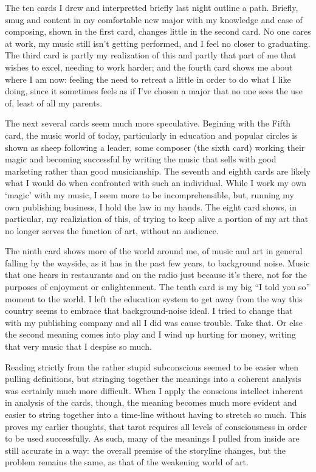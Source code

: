 The ten cards I drew and interpretted briefly last night outline a path.
Briefly, smug and content in my comfortable new major with my knowledge
and ease of composing, shown in the first card, changes little in the
second card.  No one cares at work, my music still isn't getting
performed, and I feel no closer to graduating.  The third card is partly
my realization of this and partly that part of me that wishes to excel,
needing to work harder; and the fourth card shows me about where I am
now: feeling the need to retreat a little in order to do what I like
doing, since it sometimes feels as if I've chosen a major that no one
sees the use of, least of all my parents.

The next several cards seem much more speculative.  Begining with the
Fifth card, the music world of today, particularly in education and
popular circles is shown as sheep following a leader, some composer (the
sixth card) working their magic and becoming successful by writing the
music that sells with good marketing rather than good musicianship.  The
seventh and eighth cards are likely what I would do when confronted with
such an individual.  While I work my own `magic' with my music, I seem
more to be incomprehensible, but, running my own publishing business, I
hold the law in my hands.  The eight card shows, in particular, my
realiziation of this, of trying to keep alive a portion of my art that
no longer serves the function of art, without an audience.  

The ninth card shows more of the world around me, of music and art in
general falling by the wayside, as it has in the past few years, to
background noise.  Music that one hears in restaurants and on the radio
just because it's there, not for the purposes of enjoyment or
enlightenment.  The tenth card is my big ``I told you so'' moment to the
world.  I left the education system to get away from the way this
country seems to embrace that background-noise ideal.  I tried to change
that with my publishing company and all I did was cause trouble.  Take
that.  Or else the second meaning comes into play and I wind up hurting
for money, writing that very music that I despise so much.

Reading strictly from the rather stupid subconscious seemed to be easier when pulling
definitions, but stringing together the meanings into a coherent
analysis was certainly much more difficult.  When I apply the conscious
intellect inherent in analysis of the cards, though, the meaning becomes
much more evident and easier to string together into a time-line without
having to stretch so much.  This proves my earlier thoughts, that tarot
requires all levels of consciousness in order to be used successfully.
As such, many of the meanings I pulled from inside are still accurate in
a way: the overall premise of the storyline changes, but the problem
remains the same, as that of the weakening world of art.

